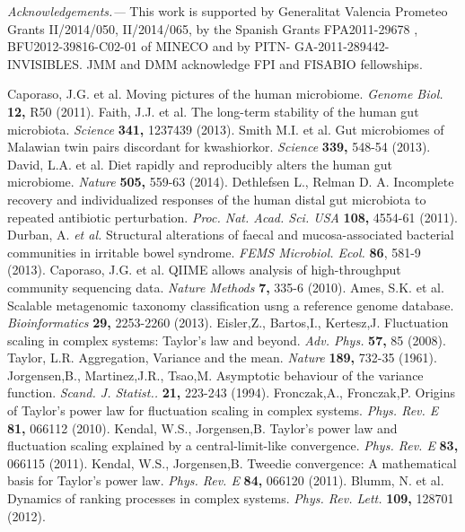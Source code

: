 \documentclass[aps,prl,twocolumn,superscriptaddress,showpacs]{revtex4}
\begin{document}
\textit{Acknowledgements.---} This work is supported by Generalitat Valencia Prometeo Grants II/2014/050, II/2014/065, by the Spanish Grants FPA2011-29678 , BFU2012-39816-C02-01 of MINECO and by PITN- GA-2011-289442-INVISIBLES. JMM and DMM acknowledge FPI and FISABIO fellowships.


\begin{thebibliography}{99}

 Caporaso, J.G. et al. Moving pictures of the human microbiome. {\it Genome Biol.} {\bf 12,} R50 (2011).
 Faith, J.J. et al. The long-term stability of the human gut microbiota. {\it Science} {\bf 341,} 1237439 (2013).
 Smith M.I. et al. Gut microbiomes of Malawian twin pairs discordant for kwashiorkor. {\it Science} {\bf 339,} 548-54 (2013).
 David, L.A. et al. Diet rapidly and reproducibly alters the human gut microbiome. {\it Nature} {\bf 505,} 559-63 (2014).
 Dethlefsen L., Relman D. A. Incomplete recovery and individualized responses of the human distal gut microbiota to repeated antibiotic perturbation. {\it Proc. Nat. Acad. Sci. USA} {\bf 108,} 4554-61 (2011).
 Durban, A. \textit{et al.} Structural alterations of faecal and mucosa-associated bacterial communities in irritable bowel syndrome. {\it FEMS Microbiol. Ecol.} {\bf 86}, 581-9 (2013).
 Caporaso, J.G. et al. QIIME allows analysis of high-throughput community sequencing data. {\it Nature Methods} {\bf 7,} 335-6 (2010).
 Ames, S.K. et al. Scalable metagenomic taxonomy classification usng a reference genome database. {\it Bioinformatics} {\bf 29,} 2253-2260 (2013).
 Eisler,Z., Bartos,I., Kertesz,J. Fluctuation scaling in complex systems: Taylor's law and beyond. {\it Adv. Phys.} {\bf 57,} 85 (2008).
 Taylor, L.R. Aggregation, Variance and the mean. {\it Nature} {\bf 189,} 732-35 (1961).
 Jorgensen,B., Martinez,J.R., Tsao,M. Asymptotic behaviour of the variance function. {\it Scand. J. Statist..} {\bf 21,} 223-243 (1994).
 Fronczak,A., Fronczak,P. Origins of Taylor's power law for fluctuation scaling in complex systems. {\it Phys. Rev. E} {\bf 81,} 066112 (2010).
 Kendal, W.S., Jorgensen,B. Taylor's power law and fluctuation scaling explained by a central-limit-like convergence. {\it Phys. Rev. E} {\bf 83,} 066115 (2011).
 Kendal, W.S., Jorgensen,B. Tweedie convergence: A mathematical basis for Taylor's power law. {\it Phys. Rev. E} {\bf 84,} 066120 (2011).
 Blumm, N. et al. Dynamics of ranking processes in complex systems. {\it Phys. Rev. Lett.} {\bf 109,} 128701 (2012).
\end{thebibliography}
\end{document}
